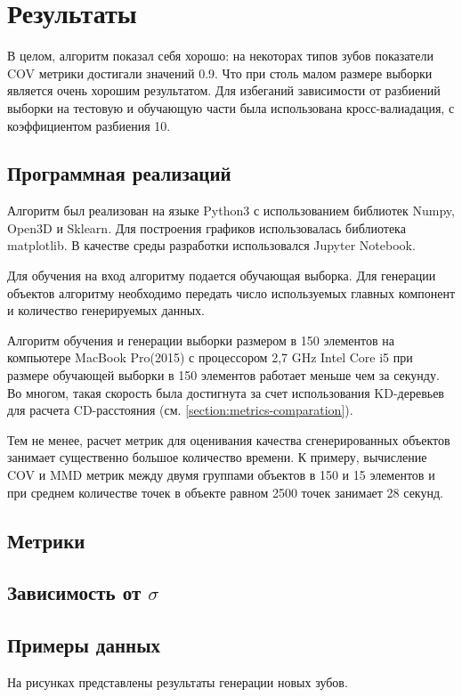 \section{Результаты} \label{section:results}

В целом, алгоритм показал себя хорошо: на некоторах типов зубов показатели COV метрики достигали значений 0.9. Что при столь малом размере выборки является очень хорошим результатом. Для избеганий зависимости от разбиений выборки на тестовую и обучающую части была использована кросс-валиадация, с коэффициентом разбиения 10.

\subsection{Программная реализаций}

Алгоритм был реализован на языке Python3 с использованием библиотек Numpy, Open3D и Sklearn. Для построения графиков использовалась библиотека matplotlib. В качестве среды разработки использовался Jupyter Notebook.

Для обучения на вход алгоритму подается обучающая выборка. Для генерации объектов алгоритму необходимо передать число используемых главных компонент и количество генерируемых данных.

Алгоритм обучения и генерации выборки размером в 150 элементов на компьютере MacBook Pro(2015) с процессором 2,7 GHz Intel Core i5 при размере обучающей выборки в 150 элементов работает меньше чем за секунду. Во многом, такая скорость была достигнута за счет использования KD-деревьев для расчета CD-расстояния (см. \ref{section:metrics-comparation}).


Тем не менее, расчет метрик для оценивания качества сгенерированных объектов занимает существенно большое количество времени. К примеру, вычисление COV и MMD метрик между двумя группами объектов в 150 и 15 элементов и при среднем количестве точек в объекте равном 2500 точек занимает 28 секунд. 


\subsection{Метрики}

\subsection{Зависимость от $\sigma$}


\subsection{Примеры данных}
На рисунках представлены результаты генерации новых зубов.